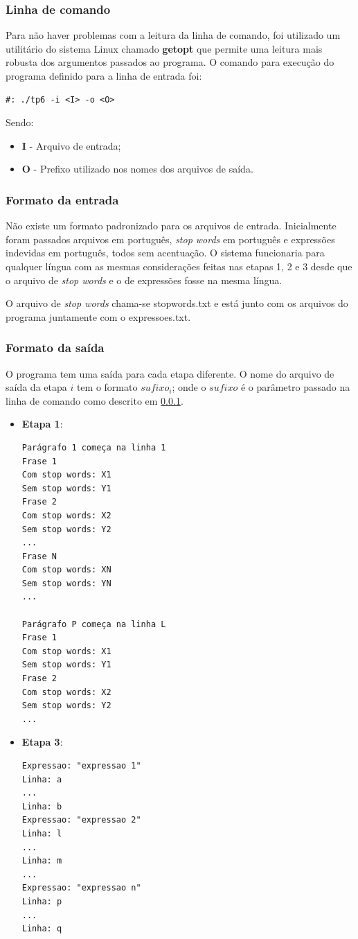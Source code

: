\documentclass[12pt]{article}
\begin{document}
\subsubsection{Linha de comando}
\label{linha_de_comando}
Para não haver problemas com a leitura da linha de comando, foi utilizado um utilitário do
sistema Linux chamado \textbf{getopt} que permite uma leitura mais robusta dos argumentos
passados ao programa. O comando para execução do programa definido para a linha de entrada 
foi:
\begin{verbatim}
#: ./tp6 -i <I> -o <O>
\end{verbatim}
Sendo: 
\begin{itemize}
  \item \textbf{I} - Arquivo de entrada;
  \item \textbf{O} - Prefixo utilizado nos nomes dos arquivos de saída.
\end{itemize}

\subsubsection{Formato da entrada}
Não existe um formato padronizado para os arquivos de entrada. Inicialmente foram passados arquivos em português, \textit{stop words} em português e expressões indevidas em português, todos sem acentuação. O sistema funcionaria para qualquer língua com as mesmas considerações feitas nas etapas 1, 2 e 3 desde que o arquivo de \textit{stop words} e o de expressões fosse na mesma língua.

O arquivo de \textit{stop words} chama-se stopwords.txt e está junto com os arquivos do programa juntamente com o expressoes.txt.

\subsubsection{Formato da saída}
O programa tem uma saída para cada etapa diferente. O nome do arquivo de saída da etapa $i$ tem o formato $sufixo_{i}$; onde o $sufixo$ é o parâmetro passado na linha de comando como descrito em \ref{linha_de_comando}.

\begin{itemize}
  \item \textbf{Etapa 1}: 
  \begin{verbatim}
Parágrafo 1 começa na linha 1
Frase 1
Com stop words: X1
Sem stop words: Y1
Frase 2
Com stop words: X2
Sem stop words: Y2
...
Frase N
Com stop words: XN
Sem stop words: YN
...

Parágrafo P começa na linha L
Frase 1
Com stop words: X1
Sem stop words: Y1
Frase 2
Com stop words: X2
Sem stop words: Y2
...
  \end{verbatim}
  \item \textbf{Etapa 3}: 
  \begin{verbatim}
Expressao: "expressao 1"
Linha: a
...
Linha: b
Expressao: "expressao 2"
Linha: l
...
Linha: m
...
Expressao: "expressao n"
Linha: p
...
Linha: q
  \end{verbatim}
\end{itemize}
\end{document}

